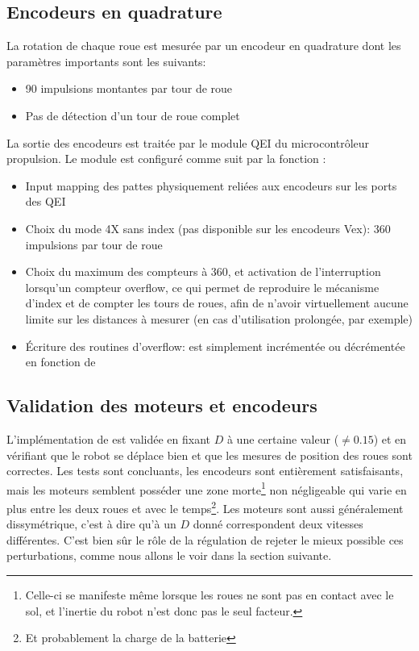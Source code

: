 \subsection{Encodeurs en quadrature}
La rotation de chaque roue est mesurée par un encodeur en quadrature dont les paramètres importants sont les suivants:
\begin{itemize}
  \item 90 impulsions montantes par tour de roue
  \item Pas de détection d'un tour de roue complet
\end{itemize}
La sortie des encodeurs est traitée par le module QEI du microcontrôleur propulsion. Le module est configuré comme suit par la fonction :
\begin{itemize}
  \item Input mapping des pattes physiquement reliées aux encodeurs sur les ports des QEI
  \item Choix du mode 4X sans index (pas disponible sur les encodeurs Vex): 360 impulsions par tour de roue
  \item Choix du maximum des compteurs à 360, et activation de l'interruption lorsqu'un compteur overflow, ce qui permet de reproduire le mécanisme d'index et de compter les tours de roues, afin de n'avoir virtuellement aucune limite sur les distances à mesurer (en cas d'utilisation prolongée, par exemple)
  \item \'Ecriture des routines d'overflow:  est simplement incrémentée ou décrémentée en fonction de 
\end{itemize}

\subsection{Validation des moteurs et encodeurs\label{sec:validMotor}}
L'implémentation de  est validée en fixant $D$ à une certaine valeur ($\neq 0.15$) et en vérifiant que le robot se déplace bien et que les mesures de position des roues sont correctes. Les tests sont concluants, les encodeurs sont entièrement satisfaisants, mais les moteurs semblent posséder une zone morte\footnote{Celle-ci se manifeste même lorsque les roues ne sont pas en contact avec le sol, et l'inertie du robot n'est donc pas le seul facteur.} non négligeable qui varie en plus entre les deux roues et avec le temps\footnote{Et probablement la charge de la batterie}. Les moteurs sont aussi généralement dissymétrique, c'est à dire qu'à un $D$ donné correspondent deux vitesses différentes. C'est bien sûr le rôle de la régulation de rejeter le mieux possible ces perturbations, comme nous allons le voir dans la section suivante.

